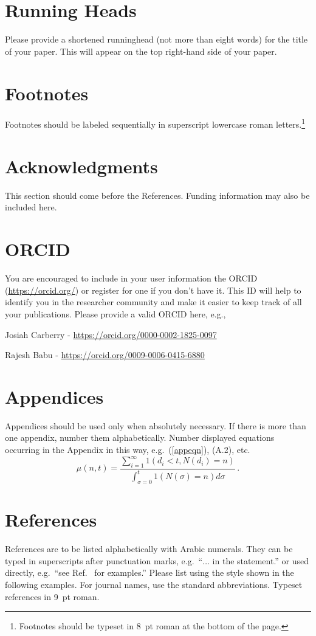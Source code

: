 \documentclass{ws-ijprai}
\begin{document}
\section{Running Heads}
Please provide a shortened runninghead (not more than eight words) for the title of your paper. This will appear on the top right-hand side of your paper.

\section{Footnotes}
Footnotes should be labeled sequentially in superscript lowercase roman letters.\footnote{Footnotes should be typeset in 8~pt roman at the bottom of the page.}

\section*{Acknowledgments}
This section should come before the References. Funding information may also be included here.

\section*{ORCID}
You are encouraged to include in your user information the ORCID (\url{https://orcid.org/}) or register for one if you don't have it.
This ID will help to identify you in the researcher community and make it easier to keep track of all your publications.
Please provide a valid ORCID here, e.g.,

\noindent Josiah Carberry - \url{https://orcid.org/0000-0002-1825-0097}

\noindent Rajesh Babu - \url{https://orcid.org/0009-0006-0415-6880}

\appendix

\section{Appendices}
Appendices should be used only when absolutely necessary. If there is more than\break
one appendix, number them alphabetically. Number displayed equations occurring in the Appendix in this way, e.g.~(\ref{appeqn}), (A.2), etc.
\begin{equation}
\mu(n, t) = \frac{\sum^\infty_{i=1} 1(d_i < t, N(d_i)
= n)}{\int^t_{\sigma=0} 1(N(\sigma) = n)d\sigma}\,.
\label{appeqn}
\end{equation}

\section*{References}
References are to be listed alphabetically with Arabic numerals.  They can be typed in superscripts after punctuation marks, e.g.~``$\ldots$ in the statement.\cite{joliat}'' or used directly, e.g.~``see Ref.~ for examples.'' Please list using the style shown in the following examples. For journal names, use the standard abbreviations. Typeset references in 9~pt roman.
\end{document}
